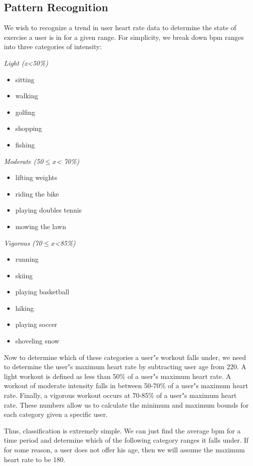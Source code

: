 \documentclass[letterpaper,english, 12pt]{scrreprt}
\begin{document}
\subsection{Pattern Recognition}
We wish to recognize a trend in user heart rate data to determine the state of exercise a user is in for a given range. For simplicity, we break down bpm ranges into three categories of intensity: \newline

\textit{Light (x<50\%)}
\begin{itemize}
	\item sitting
	\item walking
	\item golfing
	\item shopping
	\item fishing
\end {itemize}

\textit{Moderate (50$\leq{x}$< 70\%)}
\begin{itemize}
	\item lifting weights
	\item riding the bike
	\item playing doubles tennis
	\item mowing the lawn
\end {itemize}

\textit{Vigorous (70$\leq{x}$<85\%)}
\begin{itemize}
	\item running
	\item skiing
	\item playing basketball
	\item hiking
	\item playing soccer
	\item shoveling snow
\end {itemize}


Now to determine which of these categories a user"s workout falls under, we need to determine the user"s maximum heart rate by subtracting user age from 220. A light workout is defined as less than 50\% of a user"s maximum heart rate. A workout of moderate intensity falls in between 50-70\% of a user"s maximum heart rate. Finally, a vigorous workout occurs at 70-85\% of a user"s maximum heart rate. These numbers allow us to calculate the minimum and maximum bounds for each category given a specific user. \newline

Thus, classification is extremely simple. We can just find the average bpm for a time period and determine which of the following category ranges it falls under. If for some reason, a user does not offer his age, then we will assume the maximum heart rate to be 180. \newline
\end{document}
